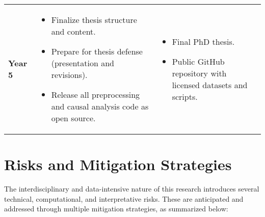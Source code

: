 \begin{longtable}{@{} >{\centering\arraybackslash}p{3cm} >{\centering\arraybackslash}p{8cm} >{\centering\arraybackslash}p{3cm} @{}}
\addlinespace[0.8em]
\textbf{Year 5} & 
\begin{minipage}[t]{8cm}\centering
\begin{itemize}[left=0pt, labelsep=4pt, itemsep=2pt]
    \item Finalize thesis structure and content.
    \item Prepare for thesis defense (presentation and revisions).
    \item Release all preprocessing and causal analysis code as open source.
\end{itemize}
\end{minipage} &
\begin{minipage}[t]{3cm}\centering
\begin{itemize}[left=0pt, labelsep=4pt, itemsep=2pt]
    \item Final PhD thesis.
    \item Public GitHub repository with licensed datasets and scripts.
\end{itemize}
\end{minipage} \\

\end{longtable}


\section{Risks and Mitigation Strategies}
\label{sec:risks_mitigation}

The interdisciplinary and data-intensive nature of this research introduces several technical, computational, and interpretative risks. These are anticipated and addressed through multiple mitigation strategies, as summarized below:

